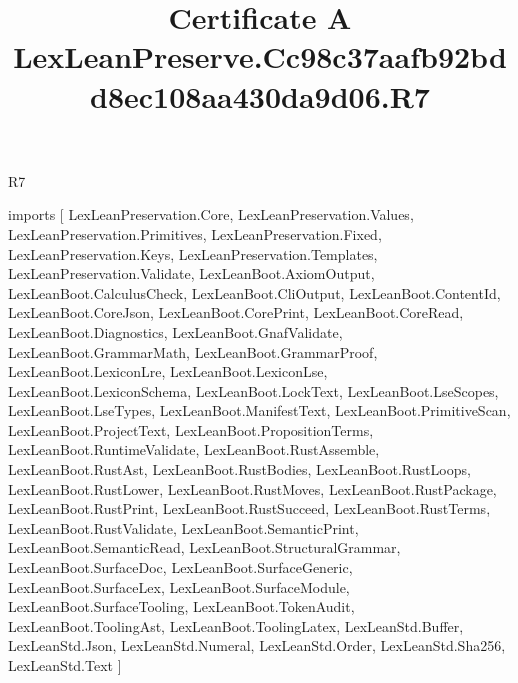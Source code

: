 \begin{lexlean}{R7}
\title{Certificate A LexLeanPreserve.Cc98c37aafb92bdd8ec108aa430da9d06.R7}
\begin{coremodule}
imports [
  LexLeanPreservation.Core,
  LexLeanPreservation.Values,
  LexLeanPreservation.Primitives,
  LexLeanPreservation.Fixed,
  LexLeanPreservation.Keys,
  LexLeanPreservation.Templates,
  LexLeanPreservation.Validate,
  LexLeanBoot.AxiomOutput,
  LexLeanBoot.CalculusCheck,
  LexLeanBoot.CliOutput,
  LexLeanBoot.ContentId,
  LexLeanBoot.CoreJson,
  LexLeanBoot.CorePrint,
  LexLeanBoot.CoreRead,
  LexLeanBoot.Diagnostics,
  LexLeanBoot.GnafValidate,
  LexLeanBoot.GrammarMath,
  LexLeanBoot.GrammarProof,
  LexLeanBoot.LexiconLre,
  LexLeanBoot.LexiconLse,
  LexLeanBoot.LexiconSchema,
  LexLeanBoot.LockText,
  LexLeanBoot.LseScopes,
  LexLeanBoot.LseTypes,
  LexLeanBoot.ManifestText,
  LexLeanBoot.PrimitiveScan,
  LexLeanBoot.ProjectText,
  LexLeanBoot.PropositionTerms,
  LexLeanBoot.RuntimeValidate,
  LexLeanBoot.RustAssemble,
  LexLeanBoot.RustAst,
  LexLeanBoot.RustBodies,
  LexLeanBoot.RustLoops,
  LexLeanBoot.RustLower,
  LexLeanBoot.RustMoves,
  LexLeanBoot.RustPackage,
  LexLeanBoot.RustPrint,
  LexLeanBoot.RustSucceed,
  LexLeanBoot.RustTerms,
  LexLeanBoot.RustValidate,
  LexLeanBoot.SemanticPrint,
  LexLeanBoot.SemanticRead,
  LexLeanBoot.StructuralGrammar,
  LexLeanBoot.SurfaceDoc,
  LexLeanBoot.SurfaceGeneric,
  LexLeanBoot.SurfaceLex,
  LexLeanBoot.SurfaceModule,
  LexLeanBoot.SurfaceTooling,
  LexLeanBoot.TokenAudit,
  LexLeanBoot.ToolingAst,
  LexLeanBoot.ToolingLatex,
  LexLeanStd.Buffer,
  LexLeanStd.Json,
  LexLeanStd.Numeral,
  LexLeanStd.Order,
  LexLeanStd.Sha256,
  LexLeanStd.Text
]


\end{coremodule}
\end{lexlean}
